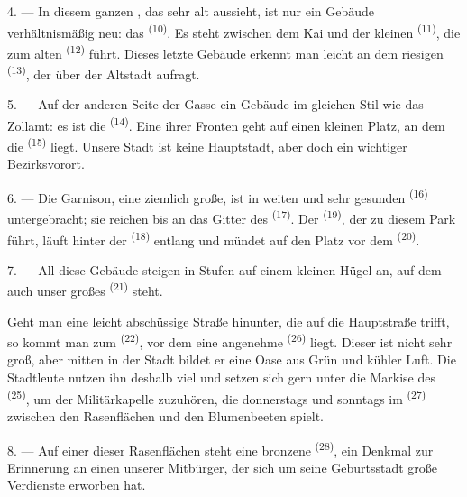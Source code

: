 4. --- In diesem ganzen , das sehr alt aussieht, ist nur ein Gebäude
verhältnismäßig neu: das  \textsuperscript{(10)}. Es steht zwischen
dem Kai und der kleinen  \textsuperscript{(11)}, die zum alten
 \textsuperscript{(12)} führt. Dieses letzte Gebäude erkennt man
leicht an dem riesigen  \textsuperscript{(13)}, der über der
Altstadt aufragt.

5. --- Auf der anderen Seite der Gasse  ein Gebäude im gleichen Stil
wie das Zollamt: es ist die  \textsuperscript{(14)}. Eine ihrer Fronten
geht auf einen kleinen Platz, an dem die  \textsuperscript{(15)}
liegt. Unsere Stadt ist keine Hauptstadt, aber doch ein wichtiger Bezirksvorort.

\VUsaut{5.0mm}
\VUsaut{3.4mm}

6. --- Die Garnison, eine ziemlich große, ist in weiten und sehr gesunden
 \textsuperscript{(16)} untergebracht; sie reichen bis an das Gitter
des  \textsuperscript{(17)}. Der 
\textsuperscript{(19)}, der zu diesem Park führt, läuft hinter der
 \textsuperscript{(18)} entlang und mündet auf den Platz vor dem
 \textsuperscript{(20)}.

7. --- All diese Gebäude steigen in Stufen auf einem kleinen Hügel an, auf dem auch
unser großes  \textsuperscript{(21)} steht.

Geht man eine leicht abschüssige Straße hinunter, die auf die Hauptstraße trifft, so
kommt man zum  \textsuperscript{(22)}, vor dem eine
angenehme  \textsuperscript{(26)} liegt. Dieser  ist
nicht sehr groß, aber mitten in der Stadt bildet er eine Oase aus Grün und kühler
Luft. Die Stadtleute nutzen ihn deshalb viel und setzen sich gern unter die Markise
des  \textsuperscript{(25)}, um der Militärkapelle zuzuhören, die
donnerstags und sonntags im  \textsuperscript{(27)} zwischen
den Rasenflächen und den Blumenbeeten spielt.

8. --- Auf einer dieser Rasenflächen steht eine bronzene 
\textsuperscript{(28)}, ein Denkmal zur Erinnerung an einen unserer Mitbürger, der
sich um seine Geburtsstadt große Verdienste erworben hat.

